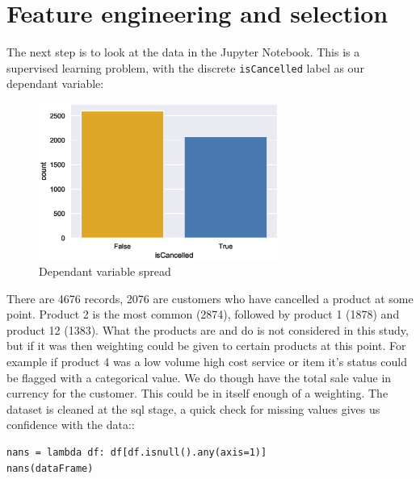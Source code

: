 \documentclass[runningheads]{llncs}
\begin{document}
\section{Feature engineering and selection}
The next step is to look at the data in the Jupyter Notebook. This is a supervised learning problem, with the discrete \texttt{isCancelled} label as our dependant variable:
\begin{figure}[ht!]
\centering
\includegraphics[width=0.7\textwidth]{dependantSpread.eps}
\caption{\label{fig:overleaf}Dependant variable spread}
\end{figure}
There are 4676 records, 2076 are customers who have cancelled a product at some point. Product 2 is the most common (2874), followed by product 1 (1878) and product 12 (1383). What the products are and do is not considered in this study, but if it was then weighting could be given to certain products at this point. For example if product 4 was a low volume high cost service or item it's status could be flagged with a categorical value. We do though have the total sale value in currency for the customer. This could be in itself enough of a weighting. The dataset is cleaned at the sql stage, a quick check for missing values gives us confidence with the data:\cite{ref_url4}:
\begin{verbatim}
nans = lambda df: df[df.isnull().any(axis=1)]
nans(dataFrame)
\end{verbatim}
\end{document}
